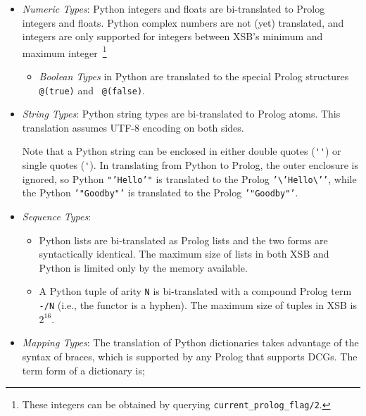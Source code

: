 \begin{itemize}
       \item {\em Numeric Types}: Python integers and floats are
         bi-translated to Prolog integers and floats.  Python complex
         numbers are not (yet) translated, and integers are only
         supported for integers between XSB's minimum and maximum
         integer~\footnote{These integers can be obtained by querying
           {\tt current\_prolog\_flag/2}.}
         \begin{itemize}
           \item {\em Boolean Types} in Python are translated to the
             special Prolog structures {\tt @(true)} and {\tt
               @(false)}.
         \end{itemize}
       \item {\em String Types}: Python string types are bi-translated
         to Prolog atoms.  This translation assumes UTF-8 encoding on
         both sides.

         Note that a Python string can be enclosed in either double
         quotes (\verb|''|) or single quotes (\verb|'|).  In
         translating from Python to Prolog, the outer enclosure is
         ignored, so Python {\tt "'Hello'"} is translated to the
         Prolog {\tt '\textbackslash{}'Hello\textbackslash{}'{}'},
         while the Python {\tt '"Goodby"'} is translated to the Prolog
         {\tt '"Goodby"'}.
       \item {\em Sequence Types}:
         \begin{itemize}
           \item Python lists are bi-translated as Prolog lists and
             the two forms are syntactically identical.  The maximum
             size of lists in both XSB and Python is limited only by
             the memory available.
           \item A Python tuple of arity {\tt N} is bi-translated with
             a compound Prolog term \verb|-/N| (i.e., the functor is a
             hyphen).  The maximum size of tuples in XSB is $2^{16}$.
         \end{itemize}
       \item {\em Mapping Types}: The translation of Python
         dictionaries takes advantage of the syntax of braces, which
         is supported by any Prolog that supports DCGs. The term form
         of a dictionary is;


\end{itemize}
